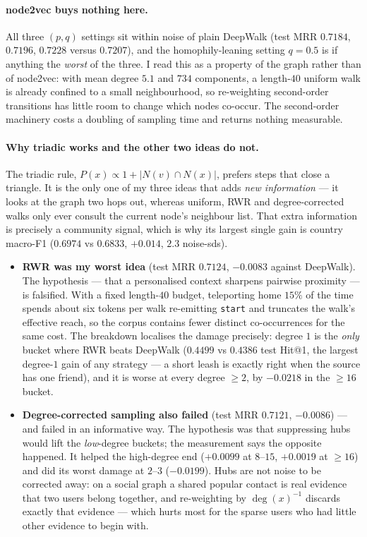 \paragraph{node2vec buys nothing here.}
All three $(p,q)$ settings sit within noise of plain DeepWalk (test MRR $0.7184$,
$0.7196$, $0.7228$ versus $0.7207$), and the homophily-leaning setting $q{=}0.5$ is if
anything the \emph{worst} of the three.  I read this as a property of the graph rather
than of node2vec: with mean degree $5.1$ and $734$ components, a length-$40$ uniform walk
is already confined to a small neighbourhood, so re-weighting second-order transitions
has little room to change which nodes co-occur.  The second-order machinery costs a
doubling of sampling time and returns nothing measurable.

\paragraph{Why triadic works and the other two ideas do not.}
The triadic rule, $P(x)\propto 1+|N(v)\cap N(x)|$, prefers steps that close a triangle.
It is the only one of my three ideas that adds \emph{new information} --- it looks at the
graph two hops out, whereas uniform, RWR and degree-corrected walks only ever consult the
current node's neighbour list.  That extra information is precisely a community signal,
which is why its largest single gain is country macro-F1 ($0.6974$ vs $0.6833$, $+0.014$,
$2.3$ noise-sds).
\begin{itemize}\itemsep1pt
\item \textbf{RWR was my worst idea} (test MRR $0.7124$, $-0.0083$ against DeepWalk).  The
hypothesis --- that a personalised context sharpens pairwise proximity --- is falsified.
With a fixed length-$40$ budget, teleporting home $15\%$ of the time spends about six
tokens per walk re-emitting \texttt{start} and truncates the walk's effective reach, so
the corpus contains fewer distinct co-occurrences for the same cost.  The breakdown
localises the damage precisely: degree $1$ is the \emph{only} bucket where RWR beats
DeepWalk ($0.4499$ vs $0.4386$ test Hit@1, the largest degree-$1$ gain of any strategy ---
a short leash is exactly right when the source has one friend), and it is worse at every
degree $\ge 2$, by $-0.0218$ in the $\ge 16$ bucket.
\item \textbf{Degree-corrected sampling also failed} (test MRR $0.7121$, $-0.0086$) --- and
failed in an informative way.  The hypothesis was that suppressing hubs would lift the
\emph{low}-degree buckets; the measurement says the opposite happened.  It helped the
high-degree end ($+0.0099$ at $8$--$15$, $+0.0019$ at $\ge 16$) and did its worst damage
at $2$--$3$ ($-0.0199$).  Hubs are not noise to be corrected away: on a social graph a
shared popular contact is real evidence that two users belong together, and re-weighting
by $\deg(x)^{-1}$ discards exactly that evidence --- which hurts most for the sparse users
who had little other evidence to begin with.
\end{itemize}

